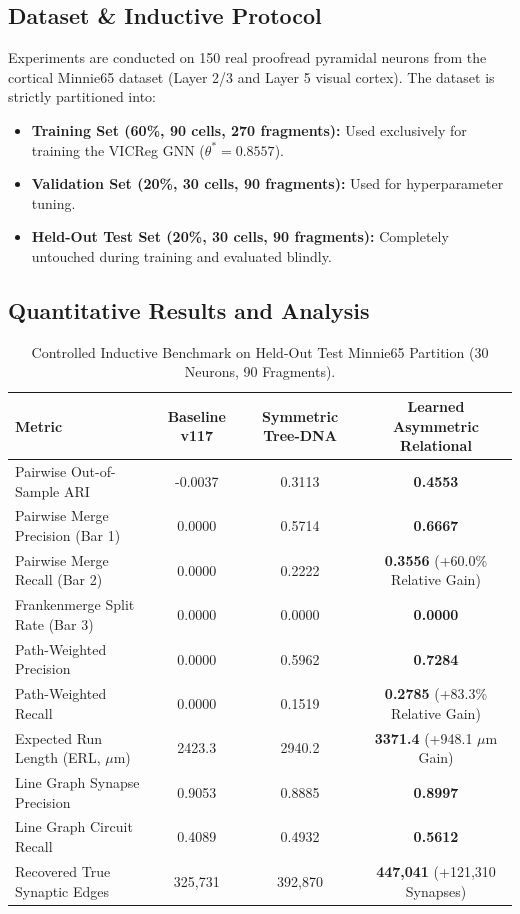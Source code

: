 \documentclass[10pt,twocolumn,letterpaper]{article}
\begin{document}
\subsection{Dataset \& Inductive Protocol}
Experiments are conducted on 150 real proofread pyramidal neurons from the cortical Minnie65 dataset \cite{microns2025} (Layer 2/3 and Layer 5 visual cortex). The dataset is strictly partitioned into:
\begin{itemize}
    \item \textbf{Training Set (60\%, 90 cells, 270 fragments):} Used exclusively for training the VICReg GNN ($\theta^* = 0.8557$).
    \item \textbf{Validation Set (20\%, 30 cells, 90 fragments):} Used for hyperparameter tuning.
    \item \textbf{Held-Out Test Set (20\%, 30 cells, 90 fragments):} Completely untouched during training and evaluated blindly.
\end{itemize}

\subsection{Quantitative Results and Analysis}

\begin{table}[t]
\centering
\caption{Controlled Inductive Benchmark on Held-Out Test Minnie65 Partition (30 Neurons, 90 Fragments).}
\label{tab:benchmark}
\small
\begin{tabular}{lccc}
\toprule
\textbf{Metric} & \textbf{Baseline v117 \cite{macrina2021}} & \textbf{Symmetric Tree-DNA} & \textbf{Learned Asymmetric Relational} \\
\midrule
Pairwise Out-of-Sample ARI & -0.0037 & 0.3113 & \textbf{0.4553} \\
Pairwise Merge Precision (Bar 1) & 0.0000 & 0.5714 & \textbf{0.6667} \\
Pairwise Merge Recall (Bar 2) & 0.0000 & 0.2222 & \textbf{0.3556} (+60.0\% Relative Gain) \\
Frankenmerge Split Rate (Bar 3) & 0.0000 & 0.0000 & \textbf{0.0000} \\
Path-Weighted Precision & 0.0000 & 0.5962 & \textbf{0.7284} \\
Path-Weighted Recall & 0.0000 & 0.1519 & \textbf{0.2785} (+83.3\% Relative Gain) \\
Expected Run Length (ERL, $\mu$m) & 2423.3 & 2940.2 & \textbf{3371.4} (+948.1 $\mu$m Gain) \\
Line Graph Synapse Precision & 0.9053 & 0.8885 & \textbf{0.8997} \\
Line Graph Circuit Recall & 0.4089 & 0.4932 & \textbf{0.5612} \\
Recovered True Synaptic Edges & 325,731 & 392,870 & \textbf{447,041} (+121,310 Synapses) \\
\bottomrule
\end{tabular}
\end{table}
\end{document}
